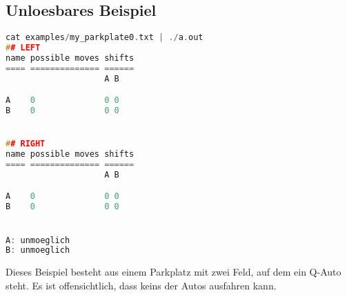 \documentclass[a4paper,10pt,ngerman]{scrartcl}
\begin{document}
\subsection*{Unloesbares Beispiel}
\begin{lstlisting}[language=C++]
cat examples/my_parkplate0.txt | ./a.out
## LEFT
name possible moves shifts
==== ============== ======
                    A B

A    0              0 0
B    0              0 0


## RIGHT
name possible moves shifts
==== ============== ======
                    A B

A    0              0 0
B    0              0 0


A: unmoeglich
B: unmoeglich
\end{lstlisting}
Dieses Beispiel besteht aus einem Parkplatz mit zwei Feld, auf dem ein Q-Auto steht.
Es ist offensichtlich, dass keins der Autos ausfahren kann.
\end{document}
